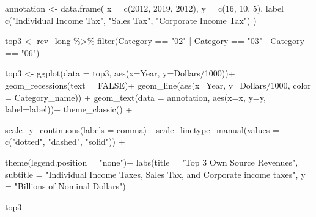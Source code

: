 \documentclass[
  letterpaper,
  DIV=11,
  numbers=noendperiod]{scrreport}
\newenvironment{Shaded}{\begin{snugshade}}{\end{snugshade}}
\newcommand{\AttributeTok}[1]{\textcolor[rgb]{0.40,0.45,0.13}{#1}}
\newcommand{\ConstantTok}[1]{\textcolor[rgb]{0.56,0.35,0.01}{#1}}
\newcommand{\DecValTok}[1]{\textcolor[rgb]{0.68,0.00,0.00}{#1}}
\newcommand{\FunctionTok}[1]{\textcolor[rgb]{0.28,0.35,0.67}{#1}}
\newcommand{\NormalTok}[1]{\textcolor[rgb]{0.00,0.23,0.31}{#1}}
\newcommand{\OtherTok}[1]{\textcolor[rgb]{0.00,0.23,0.31}{#1}}
\newcommand{\SpecialCharTok}[1]{\textcolor[rgb]{0.37,0.37,0.37}{#1}}
\newcommand{\StringTok}[1]{\textcolor[rgb]{0.13,0.47,0.30}{#1}}
\begin{document}
\begin{Shaded}
\begin{Highlighting}[]
\NormalTok{annotation }\OtherTok{\textless{}{-}} \FunctionTok{data.frame}\NormalTok{(}
  \AttributeTok{x =} \FunctionTok{c}\NormalTok{(}\DecValTok{2012}\NormalTok{, }\DecValTok{2019}\NormalTok{, }\DecValTok{2012}\NormalTok{),}
  \AttributeTok{y =} \FunctionTok{c}\NormalTok{(}\DecValTok{16}\NormalTok{, }\DecValTok{10}\NormalTok{, }\DecValTok{5}\NormalTok{),  }
  \AttributeTok{label =} \FunctionTok{c}\NormalTok{(}\StringTok{"Individual Income Tax"}\NormalTok{, }\StringTok{"Sales Tax"}\NormalTok{, }\StringTok{"Corporate Income Tax"}\NormalTok{)}
\NormalTok{)}

\NormalTok{top3 }\OtherTok{\textless{}{-}}\NormalTok{ rev\_long  }\SpecialCharTok{\%\textgreater{}\%} 
  \FunctionTok{filter}\NormalTok{(Category }\SpecialCharTok{==} \StringTok{"02"} \SpecialCharTok{|}\NormalTok{ Category }\SpecialCharTok{==} \StringTok{"03"} \SpecialCharTok{|}\NormalTok{ Category }\SpecialCharTok{==} \StringTok{"06"}\NormalTok{)}

\NormalTok{top3 }\OtherTok{\textless{}{-}} \FunctionTok{ggplot}\NormalTok{(}\AttributeTok{data =}\NormalTok{ top3, }\FunctionTok{aes}\NormalTok{(}\AttributeTok{x=}\NormalTok{Year, }\AttributeTok{y=}\NormalTok{Dollars}\SpecialCharTok{/}\DecValTok{1000}\NormalTok{))}\SpecialCharTok{+}
      \FunctionTok{geom\_recessions}\NormalTok{(}\AttributeTok{text =} \ConstantTok{FALSE}\NormalTok{)}\SpecialCharTok{+}
  \FunctionTok{geom\_line}\NormalTok{(}\FunctionTok{aes}\NormalTok{(}\AttributeTok{x=}\NormalTok{Year, }\AttributeTok{y=}\NormalTok{Dollars}\SpecialCharTok{/}\DecValTok{1000}\NormalTok{, }\AttributeTok{color =}\NormalTok{ Category\_name)) }\SpecialCharTok{+} 
  \FunctionTok{geom\_text}\NormalTok{(}\AttributeTok{data =}\NormalTok{ annotation, }\FunctionTok{aes}\NormalTok{(}\AttributeTok{x=}\NormalTok{x, }\AttributeTok{y=}\NormalTok{y, }\AttributeTok{label=}\NormalTok{label))}\SpecialCharTok{+}
    \FunctionTok{theme\_classic}\NormalTok{() }\SpecialCharTok{+}
  
  \FunctionTok{scale\_y\_continuous}\NormalTok{(}\AttributeTok{labels =}\NormalTok{ comma)}\SpecialCharTok{+}
  \FunctionTok{scale\_linetype\_manual}\NormalTok{(}\AttributeTok{values =} \FunctionTok{c}\NormalTok{(}\StringTok{"dotted"}\NormalTok{, }\StringTok{"dashed"}\NormalTok{, }\StringTok{"solid"}\NormalTok{)) }\SpecialCharTok{+}

  \FunctionTok{theme}\NormalTok{(}\AttributeTok{legend.position =} \StringTok{"none"}\NormalTok{)}\SpecialCharTok{+}
  \FunctionTok{labs}\NormalTok{(}\AttributeTok{title =} \StringTok{"Top 3 Own Source Revenues"}\NormalTok{, }
       \AttributeTok{subtitle =} \StringTok{"Individual Income Taxes, Sales Tax, and Corporate income taxes"}\NormalTok{,}
       \AttributeTok{y =} \StringTok{"Billions of Nominal Dollars"}\NormalTok{) }
  

\NormalTok{top3}
\end{Highlighting}
\end{Shaded}
\end{document}
